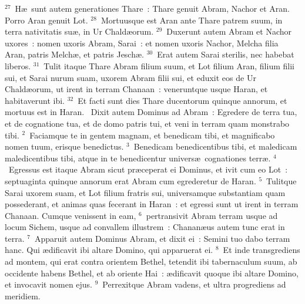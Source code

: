 ${}^{27}$~H\ae\ sunt autem generationes Thare~: Thare genuit Abram, Nachor et Aran. Porro Aran genuit Lot.
${}^{28}$~Mortuusque est Aran ante Thare patrem suum, in terra nativitatis su\ae , in Ur Chald\ae orum.
${}^{29}$~Duxerunt autem Abram et Nachor uxores~: nomen uxoris Abram, Sarai~: et nomen uxoris Nachor, Melcha filia Aran, patris Melch\ae , et patris Jesch\ae .
${}^{30}$~Erat autem Sarai sterilis, nec habebat liberos.
${}^{31}$~Tulit itaque Thare Abram filium suum, et Lot filium Aran, filium filii sui, et Sarai nurum suam, uxorem Abram filii sui, et eduxit eos de Ur Chald\ae orum, ut irent in terram Chanaan~: veneruntque usque Haran, et habitaverunt ibi.
${}^{32}$~Et facti sunt dies Thare ducentorum quinque annorum, et mortuus est in Haran.
~Dixit autem Dominus ad Abram~: Egredere de terra tua, et de cognatione tua, et de domo patris tui, et veni in terram quam monstrabo tibi.
${}^{2}$~Faciamque te in gentem magnam, et benedicam tibi, et magnificabo nomen tuum, erisque benedictus.
${}^{3}$~Benedicam benedicentibus tibi, et maledicam maledicentibus tibi, atque in te benedicentur univers\ae\ cognationes terr\ae .
${}^{4}$~Egressus est itaque Abram sicut pr\ae ceperat ei Dominus, et ivit cum eo Lot~: septuaginta quinque annorum erat Abram cum egrederetur de Haran.
${}^{5}$~Tulitque Sarai uxorem suam, et Lot filium fratris sui, universamque substantiam quam possederant, et animas quas fecerant in Haran~: et egressi sunt ut irent in terram Chanaan. Cumque venissent in eam,
${}^{6}$~pertransivit Abram terram usque ad locum Sichem, usque ad convallem illustrem~: Chanan\ae us autem tunc erat in terra.
${}^{7}$~Apparuit autem Dominus Abram, et dixit ei~: Semini tuo dabo terram hanc. Qui \ae dificavit ibi altare Domino, qui apparuerat ei.
${}^{8}$~Et inde transgrediens ad montem, qui erat contra orientem Bethel, tetendit ibi tabernaculum suum, ab occidente habens Bethel, et ab oriente Hai~: \ae dificavit quoque ibi altare Domino, et invocavit nomen ejus.
${}^{9}$~Perrexitque Abram vadens, et ultra progrediens ad meridiem.


